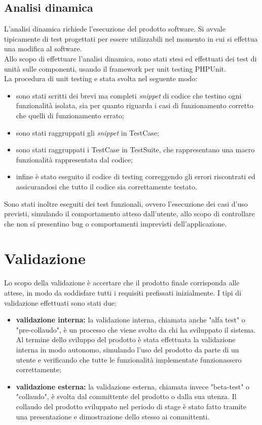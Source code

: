 \subsection{Analisi dinamica}
L'analisi dinamica richiede l'esecuzione del prodotto software. Si avvale tipicamente di test progettati per essere utilizzabili nel momento in cui si effettua una modifica al software.
\\
Allo scopo di effettuare l'analisi dinamica, sono stati stesi ed effettuati dei test di unità sulle componenti, usando il framework per unit testing PHPUnit. 
\\
La procedura di unit testing e stata svolta nel seguente modo:
\begin{itemize}
    \item sono stati scritti dei brevi ma completi \textit{snippet} di codice che testino ogni funzionalità isolata, sia per quanto riguarda i casi di funzionamento corretto che quelli di funzionamento errato;
    
    \item sono stati raggruppati gli \textit{snippet} in TestCase;
    
    \item sono stati raggruppati i TestCase in TestSuite, che rappresentano una macro funzionalità rappresentata dal codice;
    
    \item infine è stato eseguito il codice di testing correggendo gli errori riscontrati ed assicurandosi che tutto il codice sia correttamente testato.
\end{itemize}

Sono stati inoltre eseguiti dei test funzionali, ovvero l'esecuzione dei casi d'uso previsti, simulando il comportamento atteso dall'utente, allo scopo di controllare che non si presentino bug o comportamenti imprevisti dell'applicazione.

\section{Validazione}
Lo scopo della validazione è accertare che il prodotto finale corrisponda alle attese, in modo da soddisfare tutti i requisiti prefissati inizialmente. I tipi di validazione effettuati sono stati due:
\begin{itemize}
    \item \textbf{validazione interna:} la validazione interna, chiamata anche "alfa test" o "pre-collaudo", è un processo che viene svolto da chi ha sviluppato il sistema. Al termine dello sviluppo del prodotto è stata effettuata la validazione interna in modo autonomo, simulando l'uso del prodotto da parte di un utente e verificando che tutte le funzionalità implementate funzionassero correttamente;
    
    \item \textbf{validazione esterna:} la validazione esterna, chiamata invece "beta-test" o "collaudo", è svolta dal committente del prodotto o dalla sua utenza. Il collaudo del prodotto sviluppato nel periodo di stage è stato fatto tramite una presentazione e dimostrazione dello stesso ai committenti.
\end{itemize}
